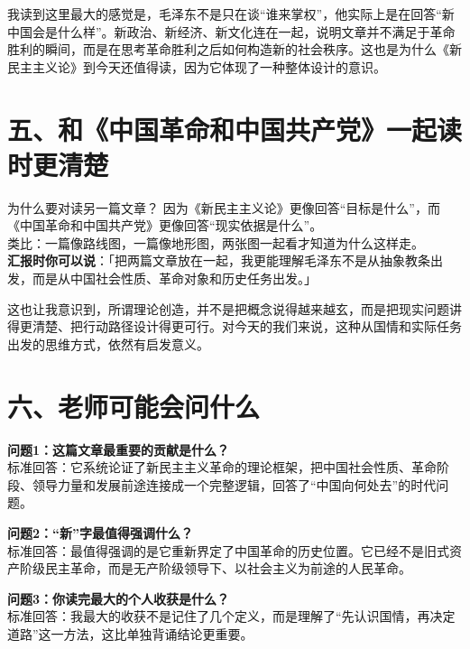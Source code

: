 \documentclass[12pt,a4paper,landscape]{article}
\begin{document}
我读到这里最大的感觉是，毛泽东不是只在谈“谁来掌权”，他实际上是在回答“新中国会是什么样”。新政治、新经济、新文化连在一起，说明文章并不满足于革命胜利的瞬间，而是在思考革命胜利之后如何构造新的社会秩序。这也是为什么《新民主主义论》到今天还值得读，因为它体现了一种整体设计的意识。

\section*{五、和《中国革命和中国共产党》一起读时更清楚}

\begin{termbox}{为什么要对读另一篇文章？}
因为《新民主主义论》更像回答“目标是什么”，而《中国革命和中国共产党》更像回答“现实依据是什么”。\\[2pt]
类比：一篇像路线图，一篇像地形图，两张图一起看才知道为什么这样走。\\[2pt]
\textbf{汇报时你可以说}：「把两篇文章放在一起，我更能理解毛泽东不是从抽象教条出发，而是从中国社会性质、革命对象和历史任务出发。」
\end{termbox}

这也让我意识到，所谓理论创造，并不是把概念说得越来越玄，而是把现实问题讲得更清楚、把行动路径设计得更可行。对今天的我们来说，这种从国情和实际任务出发的思维方式，依然有启发意义。

\section*{六、老师可能会问什么}

\textbf{问题1：这篇文章最重要的贡献是什么？}\\
标准回答：它系统论证了新民主主义革命的理论框架，把中国社会性质、革命阶段、领导力量和发展前途连接成一个完整逻辑，回答了“中国向何处去”的时代问题。

\textbf{问题2：“新”字最值得强调什么？}\\
标准回答：最值得强调的是它重新界定了中国革命的历史位置。它已经不是旧式资产阶级民主革命，而是无产阶级领导下、以社会主义为前途的人民革命。

\textbf{问题3：你读完最大的个人收获是什么？}\\
标准回答：我最大的收获不是记住了几个定义，而是理解了“先认识国情，再决定道路”这一方法，这比单独背诵结论更重要。
\end{document}
